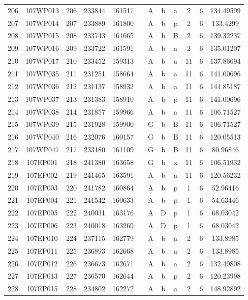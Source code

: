 \begin{tabular}{|*{12}{c|}}
206 & 107WP013 & 206 & 233844 & 161517 &  & A & b & a & 2 & 6 & 134.49599 \\ 
207 & 107WP014 & 207 & 233889 & 161800 &  & A & b & p & 2 & 6 & 133.4299 \\ 
208 & 107WP015 & 208 & 233743 & 161665 &  & A & b & B & 2 & 6 & 139.32237 \\ 
209 & 107WP016 & 209 & 233722 & 161591 &  & A & b & a & 2 & 6 & 135.01207 \\ 
210 & 107WP017 & 210 & 233452 & 159313 &  & A & b & a & 11 & 6 & 137.86694 \\ 
211 & 107WP035 & 211 & 231251 & 158664 &  & A & b & a & 11 & 6 & 141.00696 \\ 
212 & 107WP036 & 212 & 231137 & 158932 &  & A & b & a & 11 & 6 & 144.85187 \\ 
213 & 107WP037 & 213 & 231383 & 158910 &  & A & b & p & 11 & 6 & 141.00696 \\ 
214 & 107WP038 & 214 & 231857 & 159966 &  & A & b & a & 11 & 6 & 106.71527 \\ 
215 & 107WP039 & 215 & 231928 & 159900 &  & G & b & B & 11 & 6 & 106.71527 \\ 
216 & 107WP040 & 216 & 232076 & 160157 &  & G & b & B & 11 & 6 & 120.05513 \\ 
217 & 107WP047 & 217 & 233180 & 161109 &  & G & b & B & 11 & 6 & 80.96846 \\ 
218 & 107EP001 & 218 & 241380 & 163658 &  & G & b & x & 11 & 6 & 106.51932 \\ 
219 & 107EP002 & 219 & 241465 & 163591 &  & A & b & a & 11 & 6 & 120.56232 \\ 
220 & 107EP003 & 220 & 241782 & 160864 &  & A & b & p & 1 & 6 & 52.96416 \\ 
221 & 107EP004 & 221 & 241542 & 160633 &  & A & b & p & 1 & 6 & 54.63446 \\ 
222 & 107EP005 & 222 & 240031 & 163176 &  & A & D & p & 1 & 6 & 68.03042 \\ 
223 & 107EP006 & 223 & 240018 & 163269 &  & A & D & p & 1 & 6 & 68.03042 \\ 
224 & 107EP010 & 224 & 237115 & 162779 &  & A & b & a & 2 & 6 & 133.8985 \\ 
225 & 107EP011 & 225 & 236893 & 162668 &  & A & b & a & 2 & 6 & 133.8985 \\ 
226 & 107EP012 & 226 & 236673 & 162671 &  & A & b & a & 2 & 6 & 132.49808 \\ 
227 & 107EP013 & 227 & 236570 & 162644 &  & A & b & p & 2 & 6 & 120.23998 \\ 
228 & 107EP015 & 228 & 234802 & 162272 &  & A & b & a & 2 & 6 & 148.92892 \\ 

\end{tabular}
